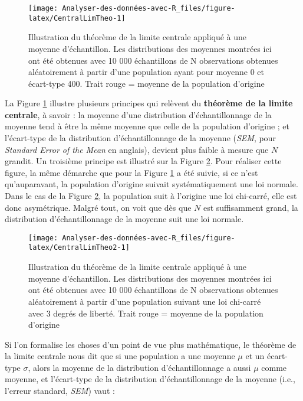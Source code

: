\documentclass[
]{book}
\begin{document}
\begin{figure}

{\centering \texttt{[image: Analyser-des-données-avec-R\_files/figure-latex/CentralLimTheo-1]} 

}

\caption{Illustration du théorème de la limite centrale appliqué à une moyenne d'échantillon. Les distributions des moyennes montrées ici ont été obtenues avec 10 000 échantillons de N observations obtenues aléatoirement à partir d'une population ayant pour moyenne 0 et écart-type 400. Trait rouge = moyenne de la population d'origine}\label{fig:CentralLimTheo}
\end{figure}

La Figure \ref{fig:CentralLimTheo} illustre plusieurs principes qui relèvent du \textbf{théorème de la limite centrale}, à savoir : la moyenne d'une distribution d'échantillonnage de la moyenne tend à être la même moyenne que celle de la population d'origine ; et l'écart-type de la distribution d'échantillonnage de la moyenne (\emph{SEM}, pour \emph{Standard Error of the Mean} en anglais), devient plus faible à mesure que \(N\) grandit. Un troisième principe est illustré sur la Figure \ref{fig:CentralLimTheo2}. Pour réaliser cette figure, la même démarche que pour la Figure \ref{fig:CentralLimTheo} a été suivie, si ce n'est qu'auparavant, la population d'origine suivait systématiquement une loi normale. Dans le cas de la Figure \ref{fig:CentralLimTheo2}, la population suit à l'origine une loi chi-carré, elle est donc asymétrique. Malgré tout, on voit que dès que \(N\) est suffisamment grand, la distribution d'échantillonnage de la moyenne suit une loi normale.

\begin{figure}

{\centering \texttt{[image: Analyser-des-données-avec-R\_files/figure-latex/CentralLimTheo2-1]} 

}

\caption{Illustration du théorème de la limite centrale appliqué à une moyenne d'échantillon. Les distributions des moyennes montrées ici ont été obtenues avec 10 000 échantillons de N observations obtenues aléatoirement à partir d'une population suivant une loi chi-carré avec 3 degrés de liberté. Trait rouge = moyenne de la population d'origine}\label{fig:CentralLimTheo2}
\end{figure}

Si l'on formalise les choses d'un point de vue plus mathématique, le théorème de la limite centrale nous dit que si une population a une moyenne \(\mu\) et un écart-type \(\sigma\), alors la moyenne de la distribution d'échantillonnage a aussi \(\mu\) comme moyenne, et l'écart-type de la distribution d'échantillonnage de la moyenne (i.e., l'erreur standard, \emph{SEM}) vaut :
\end{document}
